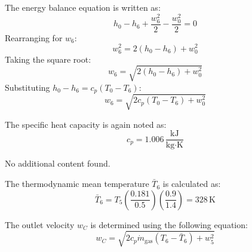 The energy balance equation is written as:  
\[
h_0 - h_6 + \frac{w_6^2}{2} - \frac{w_0^2}{2} = 0
\]  
Rearranging for \(w_6\):  
\[
w_6^2 = 2(h_0 - h_6) + w_0^2
\]  
Taking the square root:  
\[
w_6 = \sqrt{2(h_0 - h_6) + w_0^2}
\]  
Substituting \(h_0 - h_6 = c_p(T_0 - T_6)\):  
\[
w_6 = \sqrt{2 c_p (T_0 - T_6) + w_0^2}
\]  

The specific heat capacity is again noted as:  
\[
c_p = 1.006 \, \frac{\text{kJ}}{\text{kg·K}}
\]  

No additional content found.

The thermodynamic mean temperature \( \bar{T}_6 \) is calculated as:
\[
\bar{T}_6 = T_5 \left( \frac{0.181}{0.5} \right) \left( \frac{0.9}{1.4} \right) = 328 \, \text{K}
\]

The outlet velocity \( w_C \) is determined using the following equation:
\[
w_C = \sqrt{2 c_p \dot{m}_{\text{gas}} \left( T_6 - \bar{T}_6 \right) + w_5^2}
\]